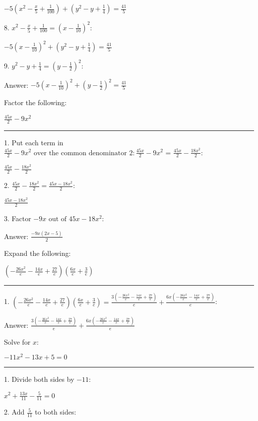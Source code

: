 \documentclass{article}
\begin{document}
$-5 \left(x^2-\frac{x}{5}+\frac{1}{100}\right)+\left(y^2-y+\frac{1}{4}\right)=\frac{41}{5}$

8. $x^2-\frac{x}{5}+\frac{1}{100}=\left(x-\frac{1}{10}\right)^2:$

$-5 \left(x-\frac{1}{10}\right)^2+\left(y^2-y+\frac{1}{4}\right)=\frac{41}{5}$

9. $y^2-y+\frac{1}{4}=\left(y-\frac{1}{2}\right)^2:$

Answer: $-5 \left(x-\frac{1}{10}\right)^2+\left(y-\frac{1}{2}\right)^2=\frac{41}{5}$

\pagebreak

Factor the following:

$\frac{45 x}{2}-9 x^2$

\hrule

1. Put each term in $\frac{45 x}{2}-9 x^2\text{ over the common denominator }2: \frac{45 x}{2}-9 x^2\text{ = }\frac{45 x}{2}-\frac{18 x^2}{2}$:

$\frac{45 x}{2}-\frac{18 x^2}{2}$

2. $\frac{45 x}{2}-\frac{18 x^2}{2}=\frac{45 x-18 x^2}{2}$:

$\frac{45 x-18 x^2}{2}$

3. Factor $-9 x\text{ out of }45 x-18 x^2:$

Answer: $\frac{-9 x (2 x-5)}{2}$

\pagebreak

Expand the following:

$\left(-\frac{26 x^2}{e}-\frac{14 x}{e}+\frac{27}{e}\right) \left(\frac{6 x}{e}+\frac{3}{e}\right)$

\hrule

1. $\left(-\frac{26 x^2}{e}-\frac{14 x}{e}+\frac{27}{e}\right) \left(\frac{6 x}{e}+\frac{3}{e}\right)=\frac{3 \left(-\frac{26 x^2}{e}-\frac{14 x}{e}+\frac{27}{e}\right)}{e}+\frac{6 x \left(-\frac{26 x^2}{e}-\frac{14 x}{e}+\frac{27}{e}\right)}{e}$:

Answer: $\frac{3 \left(-\frac{26 x^2}{e}-\frac{14 x}{e}+\frac{27}{e}\right)}{e}+\frac{6 x \left(-\frac{26 x^2}{e}-\frac{14 x}{e}+\frac{27}{e}\right)}{e}$

\pagebreak

Solve for $x:$

$-11 x^2-13 x+5=0$

\hrule

1. Divide both sides by $-11:$

$x^2+\frac{13 x}{11}-\frac{5}{11}=0$

2. Add $\frac{5}{11}$ to both sides:
\end{document}
